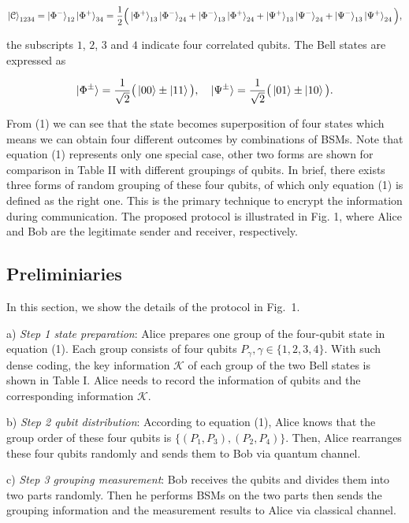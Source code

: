 \documentclass[a4paper,11pt]{article}
\begin{document}
\begin{equation*}
\ket{\mathcal{C}}_{1234} = \ket{\Phi^-}_{12} \ket{\Phi^+}_{34}
= \dfrac{1}{2} \Big(\ket{\Phi^+}_{13} \ket{\Phi^-}_{24} + 
 					\ket{\Phi^-}_{13} \ket{\Phi^+}_{24} +
 					\ket{\Psi^+}_{13} \ket{\Psi^-}_{24} +
 					\ket{\Psi^-}_{13} \ket{\Psi^+}_{24} \Big),
\end{equation*}

the subscripts $1$, $2$, $3$ and $4$ indicate four correlated qubits. The Bell states are expressed as

\begin{equation*}
\ket{\Phi^{\pm}} = \dfrac{1}{\sqrt2}\big(\ket{00} \pm \ket{11} \big), \quad
\ket{\Psi^{\pm}} = \dfrac{1}{\sqrt2}\big(\ket{01} \pm \ket{10} \big).
\end{equation*}

From (1) we can see that the state becomes superposition of four states which means we can obtain four different outcomes by combinations of BSMs. Note that equation (1) represents only one special case, other two forms are shown
for comparison in Table II with different groupings of qubits. In brief, there exists three forms of random grouping of these four qubits, of which only equation (1) is defined as the right one. This is the primary technique to encrypt the information during communication. The proposed protocol is illustrated in Fig. 1, where Alice and Bob are the legitimate sender and
receiver, respectively.

\subsection{Preliminiaries}
In this section, we show the details of the protocol in Fig.~1.

a) \textit{Step 1 state preparation}: Alice prepares one group of the four-qubit state in equation (1). Each group consists of four qubits $P_\gamma, \gamma \in \{1,2,3,4\}$. With such dense coding, the key information $\mathcal{K}$ of each group of the two Bell states is shown in Table I. Alice needs to record the information of qubits and the corresponding information $\mathcal{K}$.

b) \textit{Step 2 qubit distribution}: According to equation (1), Alice knows that the group order of these four qubits is $\{(P_1, P_3), (P_2, P_4)\}$. Then, Alice rearranges these four qubits randomly and sends them to Bob via quantum channel.

c) \textit{Step 3 grouping measurement}: Bob receives the qubits and divides them into two parts randomly. Then he performs BSMs on the two parts then sends the grouping information and the measurement results to Alice via classical channel.
\end{document}
